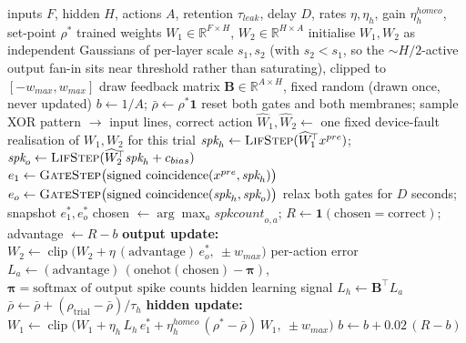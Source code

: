 \begin{algorithm}[htbp!]
\caption{Deep all-local update with feedback alignment and homeostasis (one seed).}
\label{alg:deep}
\begin{algorithmic}[1]
\Require inputs $F$, hidden $H$, actions $A$, retention $\tau_{leak}$, delay $D$, rates $\eta,\eta_h$, gain $\eta_h^{homeo}$, set-point $\rho^{\ast}$
\Ensure trained weights $W_1 \in \mathbb{R}^{F\times H}$, $W_2 \in \mathbb{R}^{H\times A}$
\State initialise $W_1, W_2$ as independent Gaussians of per-layer scale $s_1, s_2$ (with $s_2<s_1$, so the $\sim\!H/2$-active output fan-in sits near threshold rather than saturating), clipped to $[-w_{max},w_{max}]$
\State draw feedback matrix $\mathbf{B} \in \mathbb{R}^{A\times H}$, fixed random (drawn once, never updated)
\State $b \gets 1/A$; \quad $\bar\rho \gets \rho^{\ast}\mathbf{1}$
    \State reset both gates and both membranes; sample XOR pattern $\to$ input lines, correct action
    \State $\widehat{W}_1,\widehat{W}_2 \gets$ one fixed device-fault realisation of $W_1,W_2$ for this trial 
        \State $\textit{spk}_h \gets \textsc{LifStep}(\widehat{W}_1^{\!\top} x^{pre})$; \quad $\textit{spk}_o \gets \textsc{LifStep}(\widehat{W}_2^{\!\top} \textit{spk}_h + c_{bias})$
        \State $e_1 \gets \textsc{GateStep}\big(\text{signed coincidence}(x^{pre},\textit{spk}_h)\big)$
        \State $e_o \gets \textsc{GateStep}\big(\text{signed coincidence}(\textit{spk}_h,\textit{spk}_o)\big)$
    \EndFor
    \State relax both gates for $D$ seconds; snapshot $e_1^{\ast}, e_o^{\ast}$
    \State chosen $\gets \arg\max_a \textit{spkcount}_{o,a}$; \quad $R \gets \mathbf{1}(\text{chosen}=\text{correct})$; \quad advantage $\gets R-b$
    \State \textbf{output update:}\ \ $W_2 \gets \operatorname{clip}\!\big(W_2 + \eta\,(\text{advantage})\,e_o^{\ast},\ \pm w_{max}\big)$
    \State per-action error $L_a \gets (\text{advantage})\,(\text{onehot}(\text{chosen}) - \boldsymbol{\pi})$, \ $\boldsymbol{\pi}=\text{softmax of output spike counts}$
    \State hidden learning signal $L_h \gets \mathbf{B}^{\!\top} L_a$ 
    \State $\bar\rho \gets \bar\rho + (\rho_{\text{trial}} - \bar\rho)/\tau_h$ 
    \State \textbf{hidden update:}\ \ $W_1 \gets \operatorname{clip}\!\big(W_1 + \eta_h\,L_h\,e_1^{\ast} + \eta_h^{homeo}\,(\rho^{\ast}-\bar\rho)\,W_1,\ \pm w_{max}\big)$ 
    \State $b \gets b + 0.02\,(R-b)$
\EndFor
\end{algorithmic}
\end{algorithm}

